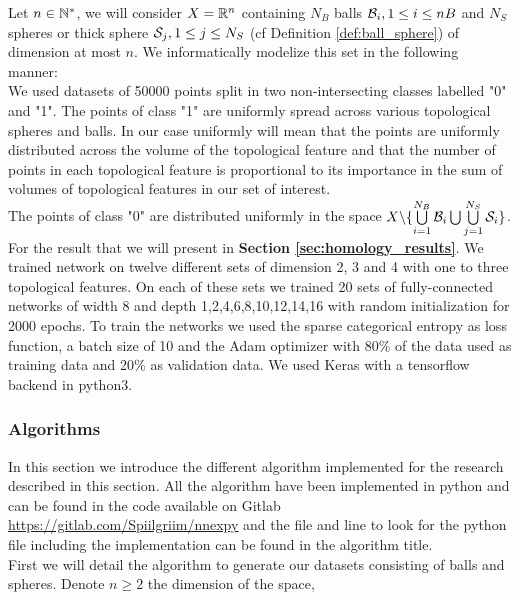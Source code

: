 \documentclass[12pt, a4paper]{article}
\begin{document}
Let $n \in \N^*$, we will consider $X = \R^n$ containing $N_B$ balls $\B_i, 1 \le i \le nB$ and $N_S$ spheres or thick sphere $\S_j, 1 \le j \le N_S$ (cf Definition \ref{def:ball_sphere}) of dimension at most $n$. We informatically modelize this set in the following manner: \\ 

We used datasets of 50000 points split in two non-intersecting classes labelled "0" and "1". The points of class "1" are uniformly spread across various topological spheres and balls. In our case uniformly will mean that the points are uniformly distributed across the volume of the topological feature and that the number of points in each topological feature is proportional to its importance in the sum of volumes of topological features in our set of interest. \\

The points of class "0" are distributed uniformly in the space $X \backslash \{\bigcup\limits_{i=1}^{N_B} \B_i \bigcup \bigcup\limits_{j=1}^{N_S} \S_i \}$.\\

For the result that we will present in \textbf{Section \ref{sec:homology_results}}. We trained network on twelve different sets of dimension 2, 3 and 4 with one to three topological features. On each of these sets we trained 20 sets of fully-connected networks of width 8 and depth 1,2,4,6,8,10,12,14,16 with random initialization for 2000 epochs. To train the networks we used the sparse categorical entropy as loss function, a batch size of 10 and the Adam optimizer with 80\% of the data used as training data and 20\% as validation data. We used Keras \cite{chollet2015keras} with a tensorflow backend in python3. 


\subsubsection{Algorithms}

In this section we introduce the different algorithm implemented for the research described in this section. All the algorithm have been implemented in python and can be found in the code available on Gitlab \url{https://gitlab.com/Spiilgriim/nnexpy} and the file and line to look for the python file including the implementation can be found in the algorithm title.\\

First we will detail the algorithm to generate our datasets consisting of balls and spheres. Denote $n \ge 2$ the dimension of the space, 
\end{document}
